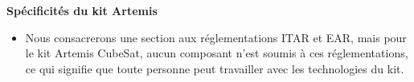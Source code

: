 \textbf{Spécificités du kit Artemis}

\begin{itemize}
    \item Nous consacrerons une section aux réglementations ITAR et EAR, mais pour le kit Artemis CubeSat, aucun composant n’est soumis à ces réglementations, ce qui signifie que toute personne peut travailler avec les technologies du kit.  
\end{itemize}
